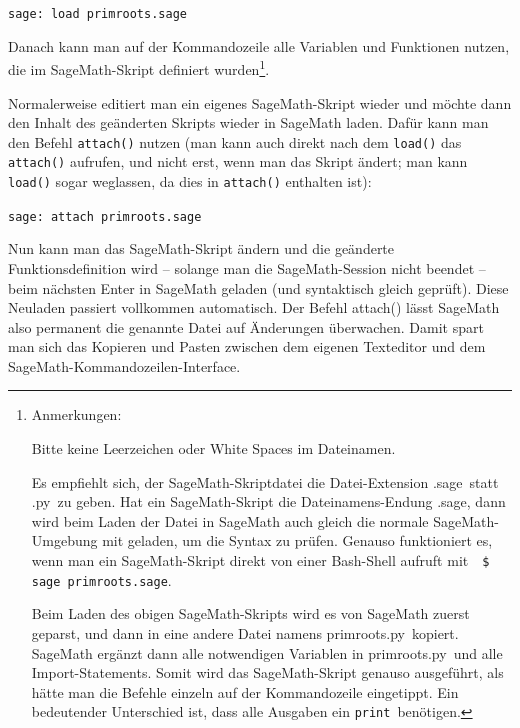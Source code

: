\texttt{sage: load primroots.sage}

\noindent Danach kann man auf der Kommandozeile alle Variablen und Funktionen
nutzen, die im Sage\-Math-Skript definiert wurden\footnote{%
Anmerkungen:

\noindent\hangindent=6pt\makebox[6pt][l]{-}Bitte keine Leerzeichen
oder White Spaces im Dateinamen.

\noindent\hangindent=6pt\makebox[6pt][l]{-}Es empfiehlt sich,
der SageMath-Skriptdatei die Datei-Extension
\glqq .sage\grqq~statt \glqq .py\grqq~zu geben.
Hat ein SageMath-Skript die Dateinamens-Endung \glqq .sage\grqq, dann wird
beim Laden der Datei in SageMath auch gleich die normale SageMath-Umgebung mit geladen,
um die Syntax zu prüfen. Genauso funktioniert es, wenn man ein SageMath-Skript direkt
von einer Bash-Shell aufruft mit~~\texttt{\$ sage primroots.sage}.

\noindent\hangindent=6pt\makebox[6pt][l]{-}Beim Laden des obigen
SageMath-Skripts wird es von SageMath zuerst geparst, und dann
in eine andere Datei namens \glqq primroots.py\grqq~kopiert. SageMath ergänzt
dann alle notwendigen Variablen in \glqq primroots.py\grqq~und alle Import-Statements.
Somit wird das SageMath-Skript genauso ausgeführt, als hätte man die Befehle einzeln
auf der Kommandozeile eingetippt. Ein bedeutender Unterschied ist,
dass alle Ausgaben ein \verb!print!~benötigen.

}.

Normalerweise editiert man ein eigenes SageMath-Skript wieder und möchte dann den
Inhalt des geänderten Skripts wieder in SageMath laden. Dafür kann man den Befehl
\verb!attach()! nutzen (man kann auch direkt nach dem \verb!load()!
das \verb!attach()! aufrufen, und nicht erst, wenn man das Skript ändert;
man kann \verb!load()! sogar weglassen, da dies in \verb!attach()! enthalten ist):

\texttt{sage: attach primroots.sage}

Nun kann man das SageMath-Skript ändern und die geänderte Funktionsdefinition
wird -- solange man die SageMath-Session nicht beendet -- beim nächsten Enter
in SageMath geladen (und syntaktisch gleich geprüft). Diese Neuladen passiert
vollkommen automatisch. Der Befehl attach() lässt SageMath also permanent die
genannte Datei auf Änderungen überwachen. Damit spart man sich das Kopieren
und Pasten zwischen dem eigenen Texteditor und dem SageMath-Kommandozeilen-Interface.

